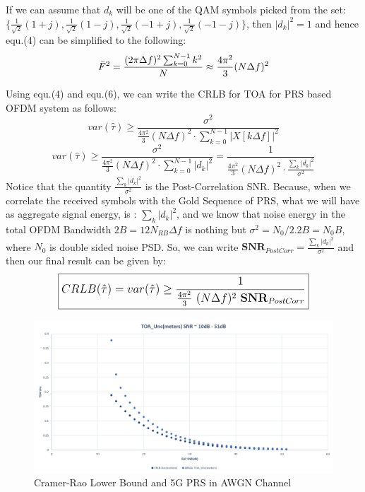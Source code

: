 \documentclass{article}
\begin{document}
If we can assume that $d_k$ will be one of the QAM symbols picked from the set: $\{ \frac{1}{\sqrt{2}} (1+j) , \frac{1}{\sqrt{2}} (1-j), \frac{1}{\sqrt{2}} (-1+j), \frac{1}{\sqrt{2}} (-1-j) \}$, then $|d_k|^2 = 1$ and hence equ.(4) can be simplified to the following:
\begin{equation} \label{eq6} \large
\bar{F}^2 = \frac{(2\pi \Delta f)^2 \sum^{N-1}_{k=0}k^2}{N} \approx  \frac{4\pi^2}{3}(N\Delta f)^2
\end{equation}

Using equ.(4) and equ.(6), we can write the CRLB for TOA for PRS based OFDM system as follows:
$$var(\hat{\tau}) \ge \frac{\sigma^2}{\frac{4\pi^2}{3}(N\Delta f)^2 \cdot \sum^{N-1}_{k=0}|X[k\Delta f]|^2}$$ $$ var(\hat{\tau}) \ge \frac{\sigma^2}{\frac{4\pi^2}{3}(N\Delta f)^2 \cdot \sum^{N-1}_{k=0}|d_k|^2} = \frac{1}{\frac{4\pi^2}{3}(N\Delta f)^2 \cdot \frac{\sum_{k}|d_k|^2}{\sigma^2}}$$
Notice that the quantity $\frac{\sum_{k}|d_k|^2}{\sigma^2}$ is the Post-Correlation SNR. Because, when we correlate the received symbols with the Gold Sequence of PRS, what we will have as aggregate signal energy, is : $\sum_{k}|d_k|^2$, and we know that noise energy in the total OFDM Bandwidth $2B = 12N_{RB}\Delta f$ is nothing but $\sigma^2 = N_0/2.2B = N_0B$, where $N_0$ is double sided noise PSD. So, we can write $\mathbf{SNR}_{PostCorr} = \frac{\sum_{k}|d_k|^2}{\sigma^2}$ and then our final result can be given by:
\begin{equation} \label{eq7}
\large
\boxed{CRLB(\hat{\tau}) = var(\hat{\tau}) \ge \frac{1}{\frac{4\pi^2}{3} \ (N\Delta f)^2 \ \mathbf{SNR}_{PostCorr}} }
\end{equation}

\newpage
\begin{figure}[h]
\caption{Cramer-Rao Lower Bound and 5G PRS in AWGN Channel}
\centering
\includegraphics[scale=0.5]{CRLB_toa}
\end{figure}
\end{document}
